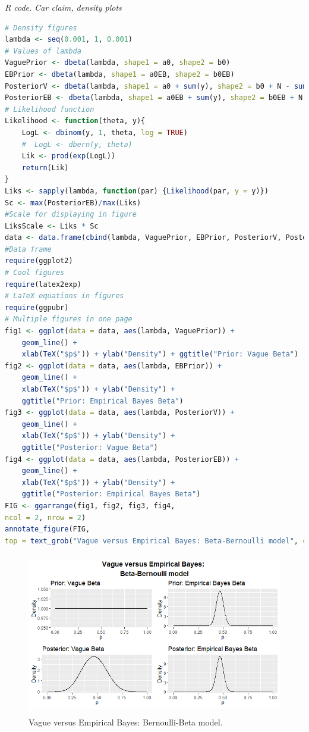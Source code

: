 \begin{enumerate}[leftmargin=*]
\begin{tcolorbox}[enhanced,width=4.67in,center upper,
	fontupper=\large\bfseries,drop shadow southwest,sharp corners]
	\textit{R code. Car claim, density plots}
\begin{VF}
\begin{lstlisting}[language=R]
# Density figures
lambda <- seq(0.001, 1, 0.001) 
# Values of lambda
VaguePrior <- dbeta(lambda, shape1 = a0, shape2 = b0)
EBPrior <- dbeta(lambda, shape1 = a0EB, shape2 = b0EB)
PosteriorV <- dbeta(lambda, shape1 = a0 + sum(y), shape2 = b0 + N - sum(y))
PosteriorEB <- dbeta(lambda, shape1 = a0EB + sum(y), shape2 = b0EB + N - sum(y))
# Likelihood function
Likelihood <- function(theta, y){
	LogL <- dbinom(y, 1, theta, log = TRUE)
	#  LogL <- dbern(y, theta)
	Lik <- prod(exp(LogL))
	return(Lik)
}
Liks <- sapply(lambda, function(par) {Likelihood(par, y = y)})
Sc <- max(PosteriorEB)/max(Liks) 
#Scale for displaying in figure
LiksScale <- Liks * Sc
data <- data.frame(cbind(lambda, VaguePrior, EBPrior, PosteriorV, PosteriorEB, LiksScale)) 
#Data frame
require(ggplot2) 
# Cool figures
require(latex2exp) 
# LaTeX equations in figures
require(ggpubr) 
# Multiple figures in one page
fig1 <- ggplot(data = data, aes(lambda, VaguePrior)) + 
	geom_line() +  
	xlab(TeX("$p$")) + ylab("Density") + ggtitle("Prior: Vague Beta") 
fig2 <- ggplot(data = data, aes(lambda, EBPrior)) + 
	geom_line() +  
	xlab(TeX("$p$")) + ylab("Density") +
	ggtitle("Prior: Empirical Bayes Beta")
fig3 <- ggplot(data = data, aes(lambda, PosteriorV)) + 
	geom_line() +  
	xlab(TeX("$p$")) + ylab("Density") +
	ggtitle("Posterior: Vague Beta")
fig4 <- ggplot(data = data, aes(lambda, PosteriorEB)) + 
	geom_line() +  
	xlab(TeX("$p$")) + ylab("Density") +
	ggtitle("Posterior: Empirical Bayes Beta")
FIG <- ggarrange(fig1, fig2, fig3, fig4,
ncol = 2, nrow = 2)
annotate_figure(FIG,
top = text_grob("Vague versus Empirical Bayes: Beta-Bernoulli model", color = "black", face = "bold", size = 14))			
\end{lstlisting}
\end{VF}
\end{tcolorbox}

\begin{figure}[!h]
	\includegraphics[width=340pt, height=200pt]{Chapters/chapter1/figures/BerBeta.png}
	\caption[List of figure caption goes here]{Vague versus Empirical Bayes: Bernoulli-Beta model.}\label{fig11}
\end{figure}


\end{enumerate}
